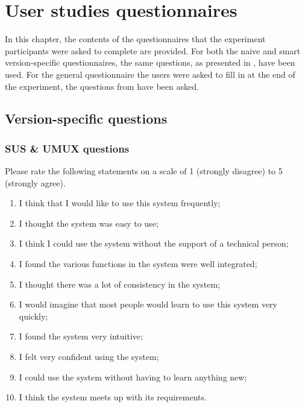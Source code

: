 \chapter{User studies questionnaires}

In this chapter, the contents of the questionnaires that the experiment participants were asked to complete are provided. For both the naive and smart version-specific questionnaires, the same questions, as presented in , have been used. For the general questionnaire the users were asked to fill in at the end of the experiment, the questions from  have been asked.

\section{Version-specific questions}
\subsection*{SUS \& UMUX questions}
Please rate the following statements on a scale of 1 (strongly disagree) to 5 (strongly agree).
\begin{enumerate}
\item I think that I would like to use this system frequently;
\item I thought the system was easy to use;
\item I think I could use the system without the support of a technical person;
\item I found the various functions in the system were well integrated;
\item I thought there was a lot of consistency in the system;
\item I would imagine that most people would learn to use this system very quickly;
\item I found the system very intuitive;
\item I felt very confident using the system;
\item I could use the system without having to learn anything new;
\item I think the system meets up with its requirements.
\end{enumerate}

